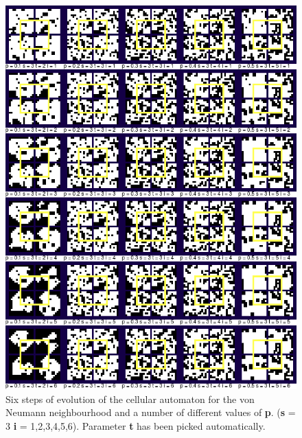 \documentclass[a4paper, 11pt]{article} %
\begin{document}
\begin{figure}[ht]
	\centering
	\includegraphics[width=1.\textwidth]{neumann_i}
	\caption{Six steps of evolution of the cellular automaton for the von Neumann neighbourhood and a number of different values of \textbf{p}. (\textbf{s} = 3 \textbf{i} = 1,2,3,4,5,6). Parameter \textbf{t} has been picked automatically.}
	\label{fig:results2}
\end{figure}
\end{document}
